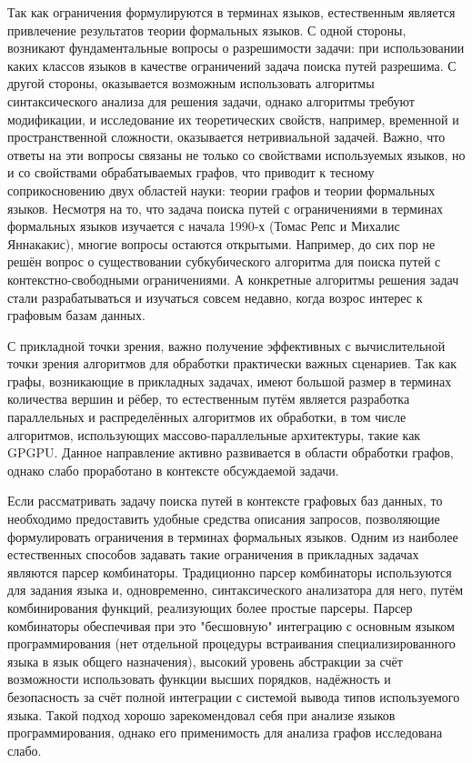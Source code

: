 \documentclass[12pt]{article}  %
\theoremstyle{remark}
\begin{document}
Так как ограничения формулируются в терминах языков, естественным является привлечение результатов теории формальных языков.
С одной стороны, возникают фундаментальные вопросы о разрешимости задачи: при использовании каких классов языков в качестве ограничений задача поиска путей разрешима.
С другой стороны, оказывается возможным использовать алгоритмы синтаксического анализа для решения задачи, однако алгоритмы требуют модификации, и исследование их теоретических свойств, например, временной и пространственной сложности, оказывается нетривиальной задачей.
Важно, что ответы на эти вопросы связаны не только со свойствами используемых языков, но и со свойствами обрабатываемых графов, что приводит к тесному соприкосновению двух областей науки: теории графов и теории формальных языков.
Несмотря на то, что задача поиска путей с ограничениями в терминах формальных языков изучается с начала 1990-х (Томас Репс и Михалис Яннакакис), многие вопросы остаются открытыми.
Например, до сих пор не решён вопрос о существовании субкубического алгоритма для поиска путей с контекстно-свободными ограничениями.
А конкретные алгоритмы решения задач стали разрабатываться и изучаться совсем недавно, когда возрос интерес к графовым базам данных.

С прикладной точки зрения, важно получение эффективных с вычислительной точки зрения алгоритмов для обработки практически важных сценариев.
Так как графы, возникающие в прикладных задачах, имеют большой размер в терминах количества вершин и рёбер, то естественным путём является разработка параллельных и распределённых алгоритмов их обработки, в том числе алгоритмов, использующих массово-параллельные архитектуры, такие как GPGPU.
Данное направление активно развивается в области обработки графов, однако слабо проработано в контексте обсуждаемой задачи.

Если рассматривать задачу поиска путей в контексте графовых баз данных, то необходимо предоставить удобные средства описания запросов, позволяющие формулировать ограничения в терминах формальных языков.
Одним из наиболее естественных способов задавать такие ограничения в прикладных задачах являются парсер комбинаторы.
Традиционно парсер комбинаторы используются для задания языка и, одновременно, синтаксического анализатора для него, путём комбинирования функций, реализующих более простые парсеры.
Парсер комбинаторы обеспечивая при это "бесшовную" интеграцию с основным языком программирования (нет отдельной процедуры встраивания специализированного языка в язык общего назначения), высокий уровень абстракции за счёт возможности использовать функции высших порядков, надёжность и безопасность за счёт полной интеграции с системой вывода типов используемого языка.
Такой подход хорошо зарекомендовал себя при анализе языков программирования, однако его применимость для анализа графов исследована слабо.
\end{document}
